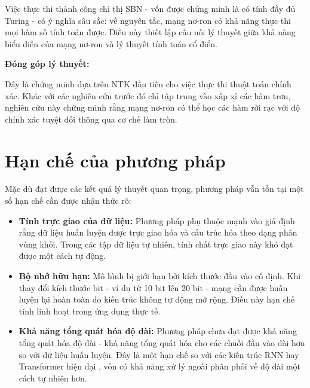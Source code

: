 \vspace{0.2cm}

Việc thực thi thành công chỉ thị SBN - vốn được chứng minh là có tính đầy đủ Turing - có ý nghĩa sâu sắc: về nguyên tắc, mạng nơ-ron có khả năng thực thi mọi hàm số tính toán được. Điều này thiết lập cầu nối lý thuyết giữa khả năng biểu diễn của mạng nơ-ron và lý thuyết tính toán cổ điển.

\vspace{0.2cm}

\textbf{Đóng góp lý thuyết:}

\vspace{0.2cm}

Đây là chứng minh dựa trên NTK đầu tiên cho việc thực thi thuật toán chính xác. Khác với các nghiên cứu trước đó chỉ tập trung vào xấp xỉ các hàm trơn, nghiên cứu này chứng minh rằng mạng nơ-ron có thể học các hàm rời rạc với độ chính xác tuyệt đối thông qua cơ chế làm tròn.

\section{Hạn chế của phương pháp}

Mặc dù đạt được các kết quả lý thuyết quan trọng, phương pháp vẫn tồn tại một số hạn chế cần được nhận thức rõ:

\begin{itemize}
    \item \textbf{Tính trực giao của dữ liệu:} Phương pháp phụ thuộc mạnh vào giả định rằng dữ liệu huấn luyện được trực giao hóa và cấu trúc hóa theo dạng phân vùng khối. Trong các tập dữ liệu tự nhiên, tính chất trực giao này khó đạt được một cách tự động.
    
    \item \textbf{Bộ nhớ hữu hạn:} Mô hình bị giới hạn bởi kích thước đầu vào cố định. Khi thay đổi kích thước bit - ví dụ từ 10 bit lên 20 bit - mạng cần được huấn luyện lại hoàn toàn do kiến trúc không tự động mở rộng. Điều này hạn chế tính linh hoạt trong ứng dụng thực tế.
    
    \item \textbf{Khả năng tổng quát hóa độ dài:} Phương pháp chưa đạt được khả năng tổng quát hóa độ dài - khả năng tổng quát hóa cho các chuỗi đầu vào dài hơn so với dữ liệu huấn luyện. Đây là một hạn chế so với các kiến trúc RNN hay Transformer hiện đại \cite{vaswani_2017}, vốn có khả năng xử lý ngoài phân phối về độ dài một cách tự nhiên hơn.
\end{itemize}

